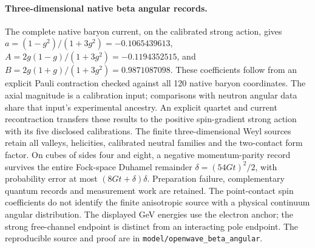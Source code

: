 \paragraph{Three-dimensional native beta angular records.}
The complete native baryon current, on the calibrated strong action, gives
\(a=(1-g^2)/(1+3g^2)=-0.1065439613\),
\(A=2g(1-g)/(1+3g^2)=-0.1194352515\), and
\(B=2g(1+g)/(1+3g^2)=0.9871087098\).
These coefficients follow from an explicit Pauli contraction checked against
all 120 native baryon coordinates. The axial magnitude is a calibration input;
comparisons with neutron angular data share that input's experimental ancestry.
An explicit quartet and current recontraction transfers these results to
the positive spin-gradient strong action with its five disclosed calibrations.
The finite three-dimensional Weyl sources retain all valleys, helicities,
calibrated neutral families and the two-contact form factor.
On cubes of sides four and eight, a negative momentum-parity record survives
the entire Fock-space Duhamel remainder
\(\delta=(54Gt)^2/2\), with probability error at most
\((8Gt+\delta)\delta\). Preparation failure, complementary quantum records
and measurement work are retained. The point-contact spin coefficients do
not identify the finite anisotropic source with a physical continuum angular
distribution. The displayed GeV energies use the electron anchor; the strong
free-channel endpoint is distinct from an interacting pole endpoint.
The reproducible source and proof are in \texttt{model/openwave\_beta\_angular}.

